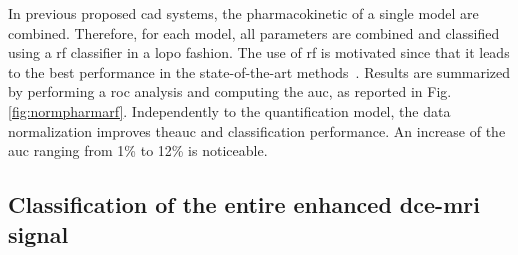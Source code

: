 In previous proposed \ac{cad} systems, the pharmacokinetic of a single model are combined.
Therefore, for each model, all parameters are combined and classified using a \ac{rf} classifier in a \ac{lopo} fashion.
The use of \ac{rf} is motivated since that it leads to the best performance in the state-of-the-art methods~\citep{litjens2014computer}.
Results are summarized by performing a \ac{roc} analysis and computing the \ac{auc}, as reported in Fig.\,\ref{fig:normpharmarf}.
Independently to the quantification model, the data normalization improves the\ac{auc} and classification performance.
An increase of the \ac{auc} ranging from 1\% to 12\% is noticeable.



\subsection{Classification of the entire enhanced \acs*{dce}-\acs*{mri} signal}

